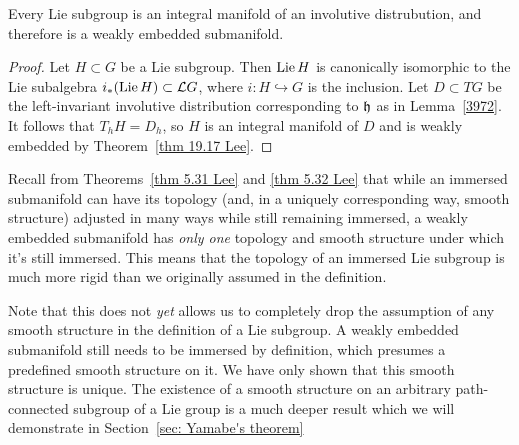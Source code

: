 \begin{thm}\label{thm 19.25 Lee}
    Every Lie subgroup is an integral manifold of an involutive distrubution, and therefore is a weakly embedded submanifold.
\end{thm}
\begin{proof}
    Let $H\subset G$ be a Lie subgroup. Then $\operatorname{Lie} H$ is canonically isomorphic to the Lie subalgebra $i_\ast(\operatorname{Lie} H)\subset \mathcal{L} G$, where $i:H\hookrightarrow G$ is the inclusion. Let $D\subset TG$ be the left-invariant involutive distribution corresponding to $\mathfrak{h}$ as in Lemma~\ref{3972}. It follows that $T_hH=D_h$, so $H$ is an integral manifold of $D$ and is weakly embedded by Theorem~\ref{thm 19.17 Lee}.
\end{proof}

Recall from Theorems~\ref{thm 5.31 Lee} and \ref{thm 5.32 Lee} that while an immersed submanifold can have its topology (and, in a uniquely corresponding way, smooth structure) adjusted in many ways while still remaining immersed, a weakly embedded submanifold has \emph{only one} topology and smooth structure under which it's still immersed. This means that the topology of an immersed Lie subgroup is much more rigid than we originally assumed in the definition.

\begin{rem}
    Note that this does not \emph{yet} allows us to completely drop the assumption of any smooth structure in the definition of a Lie subgroup. A weakly embedded submanifold still needs to be immersed by definition, which presumes a predefined smooth structure on it. We have only shown that this smooth structure is unique. The existence of a smooth structure on an arbitrary path-connected subgroup of a Lie group is a much deeper result which we will demonstrate in Section~\ref{sec: Yamabe's theorem}
\end{rem}


